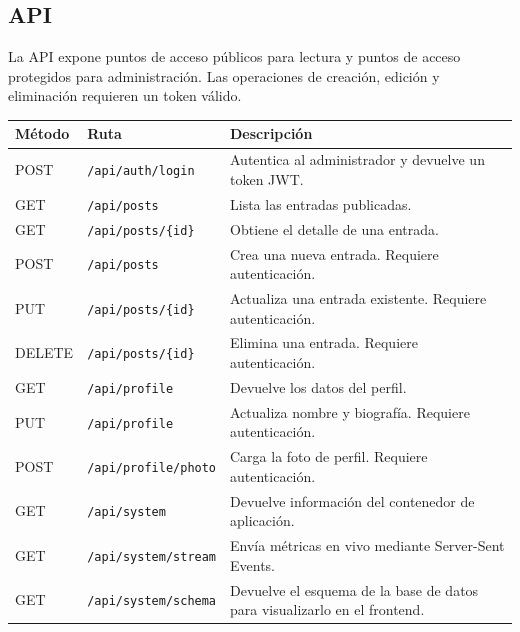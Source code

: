 \documentclass[twoside, 11pt, a4paper]{article}
\begin{document}
    \subsection{API}

    La API expone puntos de acceso públicos para lectura y puntos de acceso protegidos para administración. Las operaciones de creación, edición y eliminación requieren un token válido.

    \begin{table}[H]
        \centering
        \small
        \begin{tabular}{|l|l|p{7cm}|}
            \hline
            \textbf{Método} & \textbf{Ruta} & \textbf{Descripción} \\
            \hline
            POST & \texttt{/api/auth/login} & Autentica al administrador y devuelve un token JWT. \\
            \hline
            GET & \texttt{/api/posts} & Lista las entradas publicadas. \\
            \hline
            GET & \texttt{/api/posts/\{id\}} & Obtiene el detalle de una entrada. \\
            \hline
            POST & \texttt{/api/posts} & Crea una nueva entrada. Requiere autenticación. \\
            \hline
            PUT & \texttt{/api/posts/\{id\}} & Actualiza una entrada existente. Requiere autenticación. \\
            \hline
            DELETE & \texttt{/api/posts/\{id\}} & Elimina una entrada. Requiere autenticación. \\
            \hline
            GET & \texttt{/api/profile} & Devuelve los datos del perfil. \\
            \hline
            PUT & \texttt{/api/profile} & Actualiza nombre y biografía. Requiere autenticación. \\
            \hline
            POST & \texttt{/api/profile/photo} & Carga la foto de perfil. Requiere autenticación. \\
            \hline
            GET & \texttt{/api/system} & Devuelve información del contenedor de aplicación. \\
            \hline
            GET & \texttt{/api/system/stream} & Envía métricas en vivo mediante Server-Sent Events. \\
            \hline
            GET & \texttt{/api/system/schema} & Devuelve el esquema de la base de datos para visualizarlo en el frontend. \\

\end{tabular}
\end{table}
\end{document}
